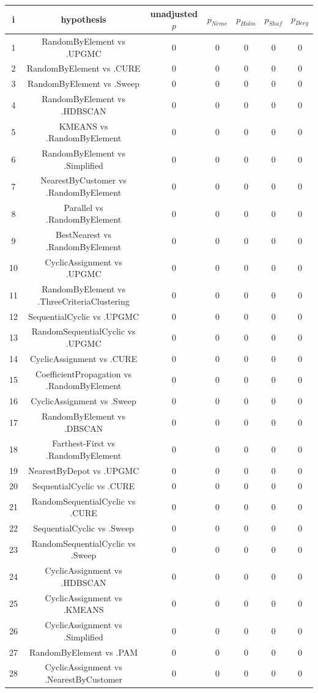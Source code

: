 \documentclass[a4paper,10pt]{article}
\begin{document}
\begin{landscape}
\begin{table}[!htp]
\centering\scriptsize
\begin{tabular}{ccccccc}
i&hypothesis&unadjusted $p$&$p_{Neme}$&$p_{Holm}$&$p_{Shaf}$&$p_{Berg}$\\
\hline1&RandomByElement vs .UPGMC&0&0&0&0&0\\
2&RandomByElement vs .CURE&0&0&0&0&0\\
3&RandomByElement vs .Sweep&0&0&0&0&0\\
4&RandomByElement vs .HDBSCAN&0&0&0&0&0\\
5&KMEANS vs .RandomByElement&0&0&0&0&0\\
6&RandomByElement vs .Simplified&0&0&0&0&0\\
7&NearestByCustomer vs .RandomByElement&0&0&0&0&0\\
8&Parallel vs .RandomByElement&0&0&0&0&0\\
9&BestNearest vs .RandomByElement&0&0&0&0&0\\
10&CyclicAssignment vs .UPGMC&0&0&0&0&0\\
11&RandomByElement vs .ThreeCriteriaClustering&0&0&0&0&0\\
12&SequentialCyclic vs .UPGMC&0&0&0&0&0\\
13&RandomSequentialCyclic vs .UPGMC&0&0&0&0&0\\
14&CyclicAssignment vs .CURE&0&0&0&0&0\\
15&CoefficientPropagation vs .RandomByElement&0&0&0&0&0\\
16&CyclicAssignment vs .Sweep&0&0&0&0&0\\
17&RandomByElement vs .DBSCAN&0&0&0&0&0\\
18&Farthest-First vs .RandomByElement&0&0&0&0&0\\
19&NearestByDepot vs .UPGMC&0&0&0&0&0\\
20&SequentialCyclic vs .CURE&0&0&0&0&0\\
21&RandomSequentialCyclic vs .CURE&0&0&0&0&0\\
22&SequentialCyclic vs .Sweep&0&0&0&0&0\\
23&RandomSequentialCyclic vs .Sweep&0&0&0&0&0\\
24&CyclicAssignment vs .HDBSCAN&0&0&0&0&0\\
25&CyclicAssignment vs .KMEANS&0&0&0&0&0\\
26&CyclicAssignment vs .Simplified&0&0&0&0&0\\
27&RandomByElement vs .PAM&0&0&0&0&0\\
28&CyclicAssignment vs .NearestByCustomer&0&0&0&0&0\\

\end{tabular}
\end{table}
\end{landscape}
\end{document}
